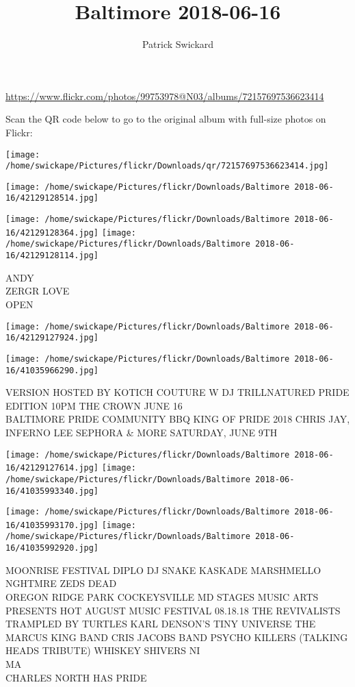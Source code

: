 \documentclass[10pt,letterpaper]{article}
\title{Baltimore 2018-06-16}
\author{Patrick Swickard}
\date{}
\begin{document}
\maketitle

\url{https://www.flickr.com/photos/99753978@N03/albums/72157697536623414}

Scan the QR code below to go to the original album with full-size photos on Flickr:

\texttt{[image: /home/swickape/Pictures/flickr/Downloads/qr/72157697536623414.jpg]}
\pagebreak

\texttt{[image: /home/swickape/Pictures/flickr/Downloads/Baltimore 2018-06-16/42129128514.jpg]}

\vspace{0.25in}
\texttt{[image: /home/swickape/Pictures/flickr/Downloads/Baltimore 2018-06-16/42129128364.jpg]}
\texttt{[image: /home/swickape/Pictures/flickr/Downloads/Baltimore 2018-06-16/42129128114.jpg]}

ANDY\\
ZERGR LOVE\\
OPEN
\pagebreak

\texttt{[image: /home/swickape/Pictures/flickr/Downloads/Baltimore 2018-06-16/42129127924.jpg]}

\vspace{0.25in}
\texttt{[image: /home/swickape/Pictures/flickr/Downloads/Baltimore 2018-06-16/41035966290.jpg]}

VERSION HOSTED BY KOTICH COUTURE W DJ TRILLNATURED PRIDE EDITION 10PM THE CROWN JUNE 16\\
BALTIMORE PRIDE COMMUNITY BBQ KING OF PRIDE 2018 CHRIS JAY, INFERNO LEE SEPHORA \& MORE SATURDAY, JUNE 9TH
\pagebreak

\texttt{[image: /home/swickape/Pictures/flickr/Downloads/Baltimore 2018-06-16/42129127614.jpg]}
\texttt{[image: /home/swickape/Pictures/flickr/Downloads/Baltimore 2018-06-16/41035993340.jpg]}

\texttt{[image: /home/swickape/Pictures/flickr/Downloads/Baltimore 2018-06-16/41035993170.jpg]}
\texttt{[image: /home/swickape/Pictures/flickr/Downloads/Baltimore 2018-06-16/41035992920.jpg]}

MOONRISE FESTIVAL DIPLO DJ SNAKE KASKADE MARSHMELLO NGHTMRE ZEDS DEAD\\
OREGON RIDGE PARK COCKEYSVILLE MD STAGES MUSIC ARTS PRESENTS HOT AUGUST MUSIC FESTIVAL 08.18.18 THE REVIVALISTS TRAMPLED BY TURTLES KARL DENSON'S TINY UNIVERSE THE MARCUS KING BAND CRIS JACOBS BAND PSYCHO KILLERS (TALKING HEADS TRIBUTE) WHISKEY SHIVERS NI\\
MA\\
CHARLES NORTH HAS PRIDE
\pagebreak
\end{document}
